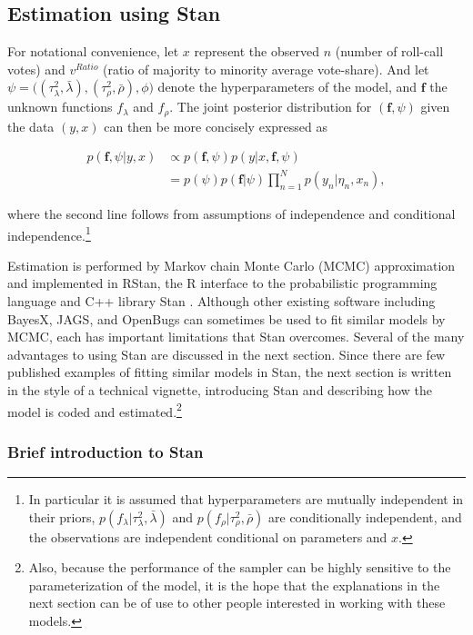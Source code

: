  \subsection{Estimation using Stan}
 \label{stan_intro}

For notational convenience, let $x$ represent the observed $n$ (number of roll-call votes) 
and $v^{Ratio}$ (ratio of majority to minority average vote-share).  And let 
$\psi = \big((\tau^2_\lambda, \bar{\lambda}), (\tau^2_\rho, \bar{\rho}), \phi \big)$ denote 
the hyperparameters of the model, and $\bm{f}$ the unknown functions  $f_\lambda$ and 
$f_\rho$. The joint posterior distribution for $(\bm{f}, \psi)$ given the data $(y, x)$ can then 
be more concisely expressed as 

\begin{align*}
p(\bm{f}, \psi | y, x) 
&\propto p(\bm{f}, \psi)  p(y | x, \bm{f}, \psi)  \\
&=p(\psi)  p(\bm{f} | \psi)   \prod_{n=1}^N p(y_n | \eta_n, x_n), 
\end{align*}

\noindent where the second line follows from assumptions of independence and conditional 
independence.\footnote{In particular it is assumed that hyperparameters are mutually independent 
in their priors, $p(f_\lambda | \tau^2_\lambda, \bar{\lambda})$ and $p(f_\rho | \tau^2_\rho, \bar{\rho})$ 
are conditionally independent, and the observations are independent conditional on parameters 
and $x$.}

Estimation is performed by Markov chain Monte Carlo (MCMC) approximation and implemented in 
RStan, the R interface to the probabilistic programming language and C++ library Stan 
. Although other existing software including BayesX, JAGS, and 
OpenBugs can sometimes be used to fit similar models by MCMC, each has important limitations 
that Stan overcomes. Several of the many advantages to using Stan are discussed in the next section. 
Since there are few published examples of fitting similar models in Stan, the next section is 
written in the style of a technical vignette, introducing Stan and describing how the model is coded 
and estimated.\footnote{Also, because the performance of the sampler can be highly sensitive to the 
parameterization of the model, it is the hope that the explanations in the next section can be of use 
to other people interested in working with these models.} 

\subsubsection{Brief introduction to Stan}



